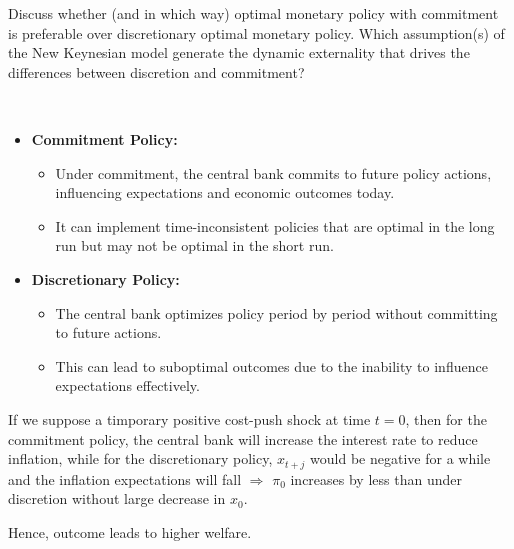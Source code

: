 \begin{problem*}[3]
    Discuss whether (and in which way) optimal monetary policy with commitment
    is preferable over discretionary optimal monetary policy. 
    Which assumption(s) of the New Keynesian model generate the dynamic 
    externality that drives the differences between discretion and commitment?
\end{problem*}

\begin{solution}
    \

    \begin{itemize}
        \item \textbf{Commitment Policy:}
        \begin{itemize}
            \item Under commitment, the central bank commits to future policy actions, influencing expectations and economic outcomes today.
            \item It can implement time-inconsistent policies that are optimal in the long run but may not be optimal in the short run.
        \end{itemize}
        \item \textbf{Discretionary Policy:}
        \begin{itemize}
            \item The central bank optimizes policy period by period without committing to future actions.
            \item This can lead to suboptimal outcomes due to the inability to influence expectations effectively.
        \end{itemize}
    \end{itemize}
    If we suppose a timporary positive cost-push shock at time $t=0$, then for the commitment policy, the central bank will increase the interest rate to reduce inflation, while for the discretionary policy, 
    $x_{t+j}$ would be negative for a while and the inflation expectations will fall $\Rightarrow$ 
    $\pi_0$ increases by less than under discretion without large decrease in $x_0$. 
    
    Hence, outcome leads to higher welfare.    
        

\end{solution}
